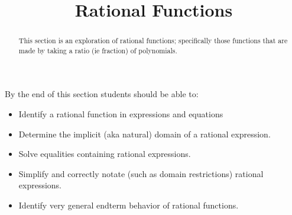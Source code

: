 \documentclass{ximera}
\title{Rational Functions}
\begin{document}
\begin{abstract}
    This section is an exploration of rational functions; specifically those functions that are made by taking a ratio (ie fraction) of polynomials.
\end{abstract}
\maketitle
By the end of this section students should be able to:

\begin{itemize}
    \item Identify a rational function in expressions and equations
    \item Determine the implicit (aka natural) domain of a rational expression.
    \item Solve equalities containing rational expressions.
    \item Simplify and correctly notate (such as domain restrictions) rational expressions.
    \item Identify very general endterm behavior of rational functions.
\end{itemize}


%
\end{document}
